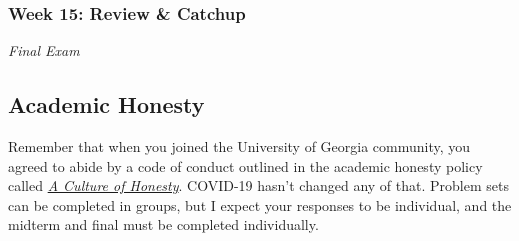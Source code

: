 \documentclass[11pt, letterpaper]{article}
\begin{document}
\subsubsection*{Week 15: Review \& Catchup}
\textit{Final Exam}







\subsection*{Academic Honesty}
Remember that when you joined the University of Georgia community, you agreed to abide by a code of conduct outlined in the academic honesty policy called \href{https://honesty.uga.edu/Academic-Honesty-Policy/Introduction/}{\textit{A Culture of Honesty}}. COVID-19 hasn't changed any of that. Problem sets can be completed in groups, but I expect your responses to be individual, and the midterm and final must be completed individually. 


\end{document}
